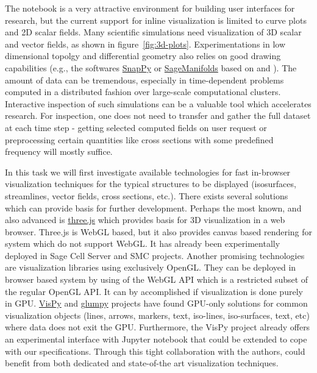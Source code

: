 \begin{workpackage}
\begin{tasklist}
\begin{task}[title=Visualization system for 3D data in web-notebook
,id=vis3d,lead=SR, partners={US,PS,USO}, PM=12, wphases=0-24]

The \Jupyter notebook is a very attractive environment for building
user interfaces for research, but the current support for inline
visualization is limited to curve plots and 2D scalar fields. Many
scientific simulations need visualization of 3D scalar and vector
fields, as shown in figure~\ref{fig:3d-plots}.
Experimentations in low dimensional topolgy and differential geometry
also relies on good drawing capabilities (e.g., the softwares
\href{http://www.math.uic.edu/t3m/SnapPy/}{SnapPy}
or \href{http://sagemanifolds.obspm.fr/}{SageManifolds} based
on \IPython and \Sage).
The amount of data can be tremendous, especially in
time-dependent problems computed in a distributed fashion over
large-scale computational clusters. Interactive inspection of such
simulations can be a valuable tool which accelerates research. For
inspection, one does not need to transfer and gather the full dataset
at each time step - getting selected computed fields on user request
or preprocessing certain quantities like cross sections with some
predefined frequency will mostly suffice.

In this task we will first investigate available technologies for fast
in-browser visualization techniques for the typical structures to be
displayed (isosurfaces, streamlines, vector fields, cross sections,
etc.).  There exists several solutions which can provide basis for
further development. Perhaps the most known, and also advanced is
\href{http://threejs.org/}{three.js} which provides basis for 3D
visualization in a web browser. Three.js is WebGL based, but it also
provides canvas based rendering for system which do not support
WebGL. It has already been experimentally deployed in Sage Cell Server
and SMC projects. Another promising technologies are visualization
libraries using exclusively OpenGL. They can be deployed in browser based
system by using of the WebGL API which is a restricted subset of the
regular OpenGL API. It can by accomplished if visualization is done
purely in GPU. \href{http://vispy.org/}{VisPy} and
\href{http://glumpy.github.io/}{glumpy} projects have found GPU-only
solutions for common visualization objects (lines, arrows, markers,
text, iso-lines, iso-surfaces, text, etc) where data does not exit the
GPU. Furthermore, the VisPy project already offers an experimental
interface with Jupyter notebook that could be extended to cope with
our specifications. Through this tight collaboration with the authors,
\TheProject could benefit from both dedicated and state-of-the art
visualization techniques.


\end{task}
\end{tasklist}
\end{workpackage}
